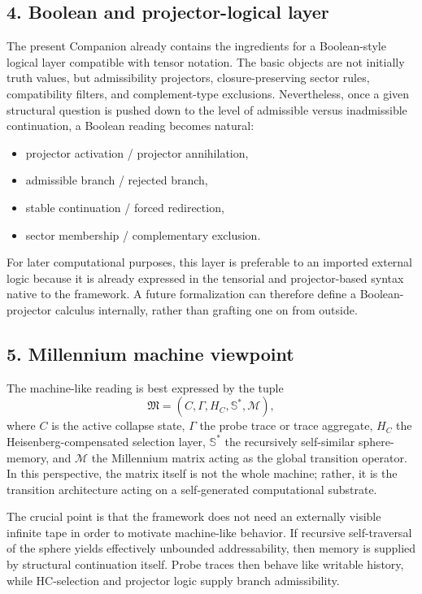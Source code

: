 \subsection*{4. Boolean and projector-logical layer}
The present Companion already contains the ingredients for a Boolean-style logical layer compatible with tensor notation. The basic objects are not initially truth values, but admissibility projectors, closure-preserving sector rules, compatibility filters, and complement-type exclusions. Nevertheless, once a given structural question is pushed down to the level of admissible versus inadmissible continuation, a Boolean reading becomes natural:
\begin{itemize}[leftmargin=2em]
  \item projector activation / projector annihilation,
  \item admissible branch / rejected branch,
  \item stable continuation / forced redirection,
  \item sector membership / complementary exclusion.
\end{itemize}
For later computational purposes, this layer is preferable to an imported external logic because it is already expressed in the tensorial and projector-based syntax native to the framework. A future formalization can therefore define a Boolean-projector calculus internally, rather than grafting one on from outside.

\subsection*{5. Millennium machine viewpoint}
The machine-like reading is best expressed by the tuple
\[
\mathfrak M=(C,\Gamma,H_C,\mathbb S^\ast,\mathcal M),
\]
where $C$ is the active collapse state, $\Gamma$ the probe trace or trace aggregate, $H_C$ the Heisenberg-compensated selection layer, $\mathbb S^\ast$ the recursively self-similar sphere-memory, and $\mathcal M$ the Millennium matrix acting as the global transition operator. In this perspective, the matrix itself is not the whole machine; rather, it is the transition architecture acting on a self-generated computational substrate.

The crucial point is that the framework does not need an externally visible infinite tape in order to motivate machine-like behavior. If recursive self-traversal of the sphere yields effectively unbounded addressability, then memory is supplied by structural continuation itself. Probe traces then behave like writable history, while HC-selection and projector logic supply branch admissibility.

